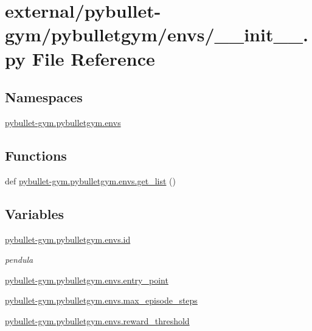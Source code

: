\hypertarget{external_2pybullet-gym_2pybulletgym_2envs_2____init_____8py}{}\section{external/pybullet-\/gym/pybulletgym/envs/\+\_\+\+\_\+init\+\_\+\+\_\+.py File Reference}
\label{external_2pybullet-gym_2pybulletgym_2envs_2____init_____8py}
\subsection*{Namespaces}
\begin{DoxyCompactItemize}
\item 
 \hyperlink{namespacepybullet-gym_1_1pybulletgym_1_1envs}{pybullet-\/gym.\+pybulletgym.\+envs}
\end{DoxyCompactItemize}
\subsection*{Functions}
\begin{DoxyCompactItemize}
\item 
def \hyperlink{namespacepybullet-gym_1_1pybulletgym_1_1envs_a99869a350565454b1a4cae3632b5ea04}{pybullet-\/gym.\+pybulletgym.\+envs.\+get\+\_\+list} ()
\end{DoxyCompactItemize}
\subsection*{Variables}
\begin{DoxyCompactItemize}
\item 
\hyperlink{namespacepybullet-gym_1_1pybulletgym_1_1envs_aed788ed65400b020bab723f70afa3aa3}{pybullet-\/gym.\+pybulletgym.\+envs.\+id}
\begin{DoxyCompactList}\small\item\em pendula \end{DoxyCompactList}\item 
\hyperlink{namespacepybullet-gym_1_1pybulletgym_1_1envs_ab632306d8a037a84b941b6c650e93397}{pybullet-\/gym.\+pybulletgym.\+envs.\+entry\+\_\+point}
\item 
\hyperlink{namespacepybullet-gym_1_1pybulletgym_1_1envs_a80ef9a1469c11fe64e4f9af9050a86fc}{pybullet-\/gym.\+pybulletgym.\+envs.\+max\+\_\+episode\+\_\+steps}
\item 
\hyperlink{namespacepybullet-gym_1_1pybulletgym_1_1envs_a8ccc77f51a77e077c3acb6c6cdceeda3}{pybullet-\/gym.\+pybulletgym.\+envs.\+reward\+\_\+threshold}
\end{DoxyCompactItemize}
